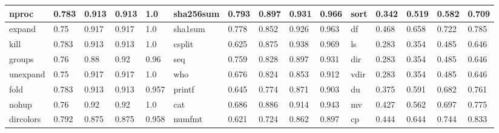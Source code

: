 \begin{table*}[h!]
\begin{center}
\begin{tabular}{ | l | l | l | l | l | l | l | l | l | l | l | l | l | l | l | }
	nproc & 0.783 & 0.913 & 0.913 & 1.0 & sha256sum & 0.793 & 0.897 & 0.931 & 0.966 & sort & 0.342 & 0.519 & 0.582 & 0.709 \\ \hline
	expand & 0.75 & 0.917 & 0.917 & 1.0 & sha1sum & 0.778 & 0.852 & 0.926 & 0.963 & df & 0.468 & 0.658 & 0.722 & 0.785 \\ \hline
	kill & 0.783 & 0.913 & 0.913 & 1.0 & csplit & 0.625 & 0.875 & 0.938 & 0.969 & ls & 0.283 & 0.354 & 0.485 & 0.646 \\ \hline
	groups & 0.76 & 0.88 & 0.92 & 0.96 & seq & 0.759 & 0.828 & 0.897 & 0.931 & dir & 0.283 & 0.354 & 0.485 & 0.646 \\ \hline
	unexpand & 0.75 & 0.917 & 0.917 & 1.0 & who & 0.676 & 0.824 & 0.853 & 0.912 & vdir & 0.283 & 0.354 & 0.485 & 0.646 \\ \hline
	fold & 0.783 & 0.913 & 0.913 & 0.957 & printf & 0.645 & 0.774 & 0.871 & 0.903 & du & 0.375 & 0.591 & 0.682 & 0.761 \\ \hline
	nohup & 0.76 & 0.92 & 0.92 & 1.0 & cat & 0.686 & 0.886 & 0.914 & 0.943 & mv & 0.427 & 0.562 & 0.697 & 0.775 \\ \hline
	dircolors & 0.792 & 0.875 & 0.875 & 0.958 & numfmt & 0.621 & 0.724 & 0.862 & 0.897 & cp & 0.444 & 0.644 & 0.744 & 0.833 \\ \hline
\end{tabular}
\end{center}
\end{table*}



